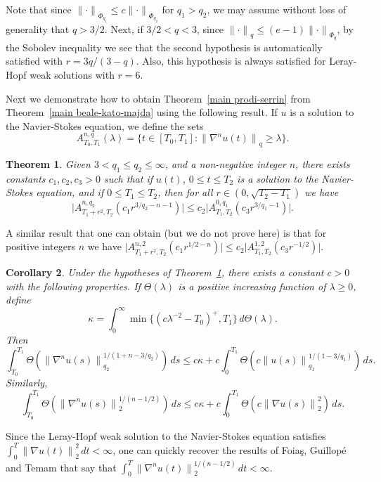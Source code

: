 \documentclass[12pt]{amsart}
\newtheorem{thm}{Theorem}[section]
\newtheorem{cor}[thm]{Corollary}
\theoremstyle{remark}
\newcommand{\smodo}[1]{{\mathopen|#1\mathclose|}}
\newcommand{\snormo}[1]{{\mathopen\|#1\mathclose\|}}
\begin{document}
\noindent
Note that since $\snormo\cdot_{\Phi_{q_1}} \le c \snormo\cdot_{\Phi_{q_2}}$
for $q_1 > q_2$, we may assume without loss of generality that $q>3/2$.
Next, if $3/2<q<3$, since $\snormo\cdot_q \le (e-1) \snormo\cdot_{\Phi_q}$, by
the Sobolev inequality we see that the second hypothesis is automatically
satisfied with $r=3q/(3-q)$.  Also, this hypothesis is always
satisfied for Leray-Hopf weak solutions with $r=6$.

Next we demonstrate how to obtain Theorem~\ref{main prodi-serrin}
from Theorem~\ref{main beale-kato-majda} using the following
result.  If $u$ is a solution to the Navier-Stokes equation, we define the
sets
$$ A^{n,q}_{T_0,T_1}(\lambda) =
   \{ t\in[T_0,T_1] :
   \snormo{\nabla^n u(t)}_q \ge \lambda \} .$$

\begin{thm} \label{main foias-guillope-temam}
Given $3 < q_1 \le q_2 \le \infty$, and a non-negative integer $n$,
there exists
constants $c_1,c_2,c_3>0$ such that
if $u(t)$, $0 \le t \le T_2$ 
is a solution to the Navier-Stokes equation, and if $0\le T_1 \le T_2$,
then for all
$r \in (0,\sqrt{T_2-T_1})$ we have
$$ \smodo{A^{n,q_2}_{T_1+r^2,T_2}(c_1 r^{3/q_2-n-1})} 
   \le c_2 \smodo{A^{0,q_1}_{T_1,T_2}(c_3 r^{3/q_1-1})} .$$
\end{thm}

A similar result that one can obtain (but we do not prove here) is 
that for positive integers $n$ we have
$ \smodo{A^{n,2}_{T_1+r^2,T_2}(c_1 r^{1/2-n})} 
   \le c_2 \smodo{A^{1,2}_{T_1,T_2}(c_3 r^{-1/2})} $.

\begin{cor} 
\label{cor foias-guillope-temam}
Under the hypotheses of Theorem~\ref{main foias-guillope-temam}, there
exists a constant $c>0$ with the following properties.
If
$\Theta(\lambda)$ is a positive increasing function of $\lambda\ge 0$,
define 
$$ \kappa = 
   \int_0^\infty \min\{(c\lambda^{-2}-T_0)^+,T_1\} \, d\Theta(\lambda) .$$
Then
$$
   \int_{T_0}^{T_1} \Theta(\snormo{\nabla^n u(s)}_{q_2}^{1/(1+n-3/q_2)}) \, ds
   \le 
   c \kappa + c \int_0^{T_1} \Theta(c\snormo{u(s)}_{q_1}^{1/(1-3/q_1)}) \, ds .
$$
Similarly,
$$
   \int_{T_0}^{T_1} \Theta(\snormo{\nabla^n u(s)}_2^{1/(n-1/2)}) \, ds
   \le 
   c \kappa + c \int_0^{T_1} \Theta(c\snormo{\nabla u(s)}_2^2) \, ds .
$$
\end{cor}

Since the Leray-Hopf weak solution to the Navier-Stokes equation satisfies
$\int_0^T \snormo{\nabla u(t)}_2^2 \, dt < \infty$, one can quickly 
recover the results of 
Foia\c s, Guillop\'e and Temam
\cite{foias et al} that say that
$\int_0^T \snormo{\nabla^n u(t)}_2^{1/(n-1/2)} \, dt < \infty$.
\end{document}
